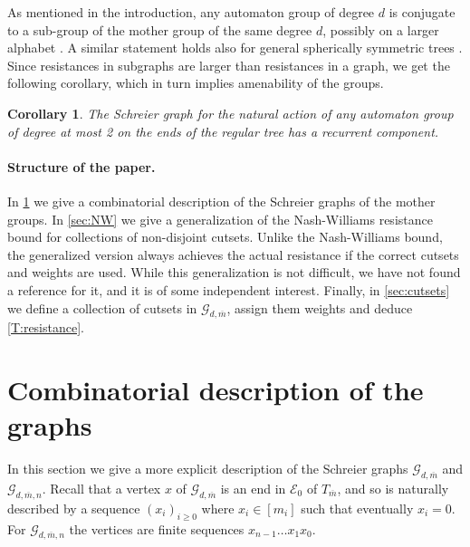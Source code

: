 \documentclass[12pt]{article}
\newtheorem{thm}{Theorem}[section]
\newtheorem{corollary}[thm]{Corollary}
\theoremstyle{definition}
\numberwithin{equation}{section}
\newcommand{\note}[1]{{\bf \textcolor{red}{[#1]}}}
\newcommand{\cG}{\mathcal{G}}
\newcommand{\cE}{\mathcal{E}}
\newcommand{\mbar}{{\overline m}}
\begin{document}

As mentioned in the introduction, any automaton group of degree $d$ is conjugate to a sub-group of the mother group of the same degree $d$, possibly on a larger alphabet \cite{AAV}.
A similar statement holds also for general spherically symmetric trees \cite{Bri09}.
Since resistances in subgraphs are larger than resistances in a graph, we get the following corollary, which in turn implies amenability of the groups.

\begin{corollary}
  The Schreier graph for the natural action of any automaton group of degree at most 2 on the ends of the regular tree has a recurrent component.
\end{corollary}


\paragraph{Structure of the paper.}
In \cref{sec:graphs} we give a combinatorial description of the Schreier graphs of the mother groups.
In \cref{sec:NW} we give a generalization of the Nash-Williams resistance bound for collections of non-disjoint cutsets.
Unlike the Nash-Williams bound, the generalized version always achieves the actual resistance if the correct cutsets and weights are used.
While this generalization is not difficult, we have not found a reference for it, and it is of some independent interest.
Finally, in \cref{sec:cutsets} we define a collection of cutsets in $\cG_{d,\mbar}$, assign them weights and deduce \cref{T:resistance}.



\section{Combinatorial description of the graphs}
\label{sec:graphs}

In this section we give a more explicit description of the Schreier graphs $\cG_{d,\mbar}$ and $\cG_{d,\mbar,n}$.
Recall that a vertex $x$ of $\cG_{d,\mbar}$ is an end in $\cE_0$ of $T_\mbar$, and so is naturally described by a sequence $(x_i)_{i\geq0}$ where $x_i\in[m_i]$ such that eventually $x_i=0$.
For $\cG_{d,\mbar,n}$ the vertices are finite sequences $x_{n-1}\dots x_1 x_0$.
\end{document}
